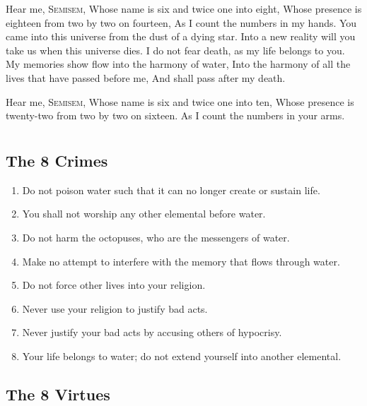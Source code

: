 \documentclass[12pt, letterpaper]{report}
\begin{document}
\begin{poem}
\begin{stanza}
Hear me, S\textsc{emisem},\verseline
Whose name is six and twice one into eight,\verseline
Whose presence is eighteen from two by two on fourteen,\verseline
As I count the numbers in my hands.\verseline
You came into this universe from the dust of a dying star.\verseline
Into a new reality will you take us when this universe dies.\verseline
I do not fear death, as my life belongs to you.\verseline
My memories show flow into the harmony of water,\verseline
Into the harmony of all the lives that have passed before me,\verseline
And shall pass after my death.
\end{stanza}
\begin{stanza}
Hear me, S\textsc{emisem},\verseline
Whose name is six and twice one into ten,\verseline
Whose presence is twenty-two from two by two on sixteen.\verseline
As I count the numbers in your arms.
\end{stanza}
\end{poem}


\chapter{}

\section{The 8 Crimes}

\begin{enumerate}
  \item Do not poison water such that it can no longer create or sustain life.
  \item You shall not worship any other elemental before water.
  \item Do not harm the octopuses, who are the messengers of water.
  \item Make no attempt to interfere with the memory that flows through water.
  \item Do not force other lives into your religion.
  \item Never use your religion to justify bad acts.
  \item Never justify your bad acts by accusing others of hypocrisy.
  \item Your life belongs to water; do not extend yourself into another elemental.
\end{enumerate}

\section{The 8 Virtues}
\end{document}
